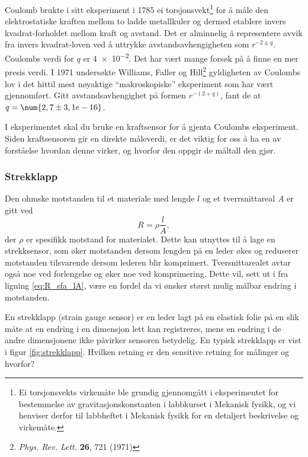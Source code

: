 \documentclass[../Elmag-labhefte-2020.tex]{subfiles}
\begin{document}
Coulomb brukte i sitt eksperiment i 1785 ei torsjonsvekt\footnote{Ei torsjonsvekts virkemåte ble grundig gjennomgått i eksperimentet for bestemmelse av gravitasjonskonstanten i labbkurset i Mekanisk fysikk, og vi henviser derfor til labbheftet i Mekanisk fysikk for en detaljert beskrivelse og virkemåte.} for å måle den elektrostatiske kraften mellom to ladde metallkuler og dermed etablere invers kvadrat-forholdet mellom kraft og avstand. Det er alminnelig å representere avvik fra invers kvadrat-loven ved å uttrykke avstandsavhengigheten som $r^{-2\pm q}$. Coulombs verdi for $q$ er \num{4e-2}. Det har vært mange forsøk på å finne en mer presis verdi. I 1971 undersøkte Williams, Faller og Hill\footnote{\textit{Phys. Rev. Lett.} \textbf{26}, 721 (1971)} gyldigheten av Coulombs lov i det hittil mest nøyaktige  ``makroskopiske'' eksperiment som har vært gjennomført. Gitt avstandsavhengighet på formen $r^{-(2+q)}$, fant de at $q = \num{2,7\pm3,1e-16}$.

I eksperimentet skal du bruke en kraftsensor for å gjenta Coulombs eksperiment. Siden kraftsensoren gir en direkte måleverdi, er det viktig for oss å ha en av forståelse hvordan denne virker, og hvorfor den oppgir de måltall den gjør.


\subsubsection{Strekklapp}\vspace{-5mm}
Den ohmske motstanden til et materiale med lengde $l$ og et tverrsnittareal $A$ er gitt ved   
\begin{equation}
    R = \rho \frac{l}{A},
    \label{eq:R_sfa_lA}
\end{equation}
der $\rho$ er spesifikk motstand for materialet. Dette kan utnyttes til å lage en strekksensor, som øker motstanden dersom lengden på en leder økes og reduserer motstanden tilsvarende dersom lederen blir komprimert. Tversnittarealet avtar også noe ved forlengelse og øker noe ved komprimering. Dette vil, sett ut i fra ligning \eqref{eq:R_sfa_lA}, være en fordel da vi ønsker størst mulig målbar endring i motstanden.

En strekklapp (strain gauge sensor) er en leder lagt på en elastisk folie på en slik måte at en endring i en dimensjon lett kan registreres, mens en endring i de andre dimensjonene ikke påvirker sensoren betydelig. En typisk strekklapp er vist i figur \ref{fig:strekklapp}. Hvilken retning er den sensitive retning for målinger og hvorfor?
\end{document}
